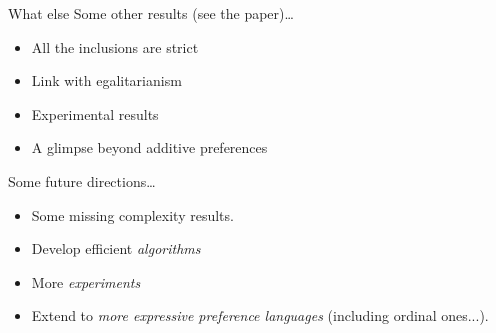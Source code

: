 \documentclass[9pt,english]{beamer}
\begin{document}
\begin{frame}{What else}
  Some other results (see the paper)\dots
  \begin{itemize}
  \item All the inclusions are strict
  \item Link with egalitarianism
  \item Experimental results
  \item A glimpse beyond additive preferences
  \end{itemize}

  \pause\vfill

  Some future directions\dots

  \begin{itemize}
  \item Some missing complexity results.
  \item Develop efficient \emph{algorithms}
  \item More \emph{experiments}
  \item Extend to \emph{more expressive preference languages}
    (including ordinal ones...).
  \end{itemize}
\end{frame}
\end{document}
